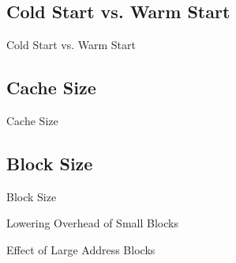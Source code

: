 \documentclass{beamer}
\begin{document}
\subsection{Cold Start vs. Warm Start}
\begin{frame}{Cold Start vs. Warm Start}
	
\end{frame}

\subsection{Cache Size}
\begin{frame}{Cache Size}
	
\end{frame}

\subsection{Block Size}
\begin{frame}{Block Size}
	
\end{frame}

\begin{frame}{Lowering Overhead of Small Blocks}
	
\end{frame}

\begin{frame}{Effect of Large Address Blocks}
	
\end{frame}




\end{document}

